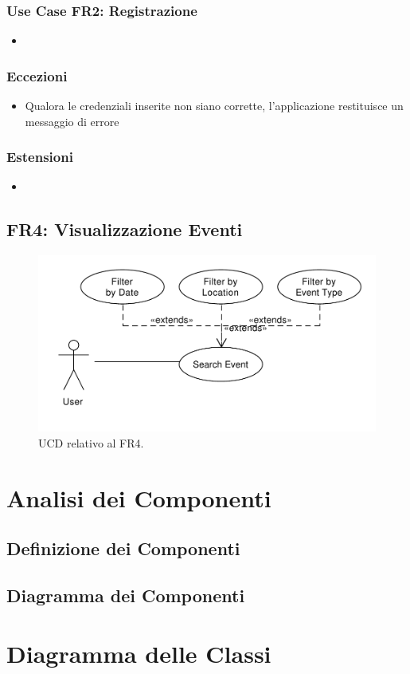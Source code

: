 \documentclass[9pt]{extarticle}
\begin{document}
\subsubsection*{Use Case FR2: Registrazione}

\begin{itemize}
	\item 
\end{itemize}


\subsubsection*{Eccezioni}\label{Eccezioni}

\begin{itemize}
	\item Qualora le credenziali inserite non siano corrette, l'applicazione restituisce un messaggio di errore
\end{itemize}

\subsubsection*{Estensioni}\label{Estensioni}

\begin{itemize}
	\item 
\end{itemize}

\subsection*{FR4: Visualizzazione Eventi}

\begin{figure}[!htb]
	\centering
	\includegraphics[width=.7\linewidth]{./images/FR4.pdf}
	\caption{UCD relativo al FR4.}
	\label{fig:UCD_FR4}
\end{figure}


\section{Analisi dei Componenti}

\subsection{Definizione dei Componenti}


\subsection{Diagramma dei Componenti}

\section{Diagramma delle Classi}




	
\end{document}
